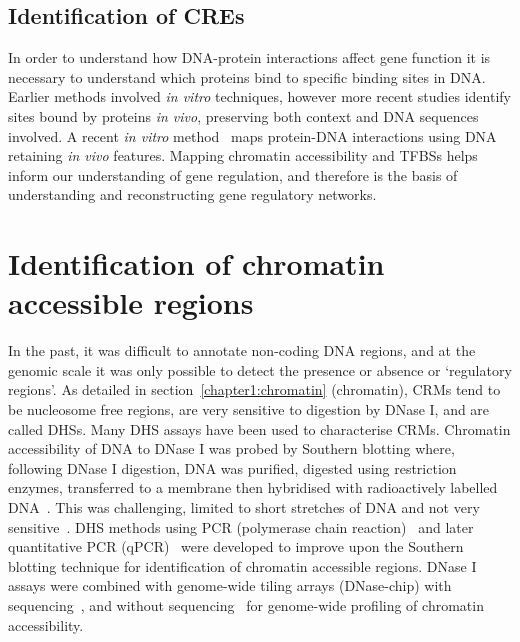 \documentclass[../main.tex]{subfiles}
\begin{document}
\subsection{Identification of CREs}\label{chapter1:identification-of-cres}

In order to understand how DNA\hyp{}protein interactions affect gene function it is necessary to understand which proteins bind to specific binding sites in DNA.
Earlier methods involved \textit{in vitro} techniques, however more recent studies identify sites bound by proteins \textit{in vivo}, preserving both context and DNA sequences involved.
A recent \textit{in vitro} method~\autocite{omalleyCistromeEpicistromeFeatures2016} maps protein\hyp{}DNA interactions using DNA retaining \textit{in vivo} features.
Mapping chromatin accessibility and TFBSs helps inform our understanding of gene regulation, and therefore is the basis of understanding and reconstructing gene regulatory networks.

\section{Identification of chromatin accessible
  regions}\label{chapter1:identification-of-chromatin-accessible-regions}
In the past, it was difficult to annotate non\hyp{}coding DNA regions, and at the genomic scale it was only possible to detect the presence or absence or `regulatory regions'.
As detailed in section~\ref{chapter1:chromatin} (chromatin), CRMs tend to be nucleosome free regions, are very sensitive to digestion by DNase I, and are called  DHSs. Many DHS assays have been used to characterise CRMs.
Chromatin accessibility of DNA to DNase I was probed by Southern blotting where, following DNase I digestion, DNA was purified, digested using restriction enzymes, transferred to a membrane then hybridised with radioactively labelled DNA~\autocite{wuChromatinStructureSpecific1979,matherMethylationStatusDNase1983,benderVglobinGeneSwitching2000,wangChromatinStructureMapping2001}.
This was challenging, limited to short stretches of DNA and not very sensitive~\autocite{cockerillIdentificationDNaseIHypersensitive2000}.
DHS methods using PCR (polymerase chain reaction)~\autocite{pfeiferChromatinDifferencesActive1991,fengHighresolutionAnalysisCfos1992} and later quantitative PCR (qPCR)~\autocite{mcarthurQuantificationDNaseIsensitivityRealtime2001,dorschnerHighthroughputLocalizationFunctional2004,martinsTrackingChromatinStates2007} were developed to improve upon the Southern blotting technique for identification of chromatin accessible regions.
DNase I assays were combined with genome\hyp{}wide tiling arrays (DNase-chip) with sequencing~\autocite{crawfordIdentifyingGeneRegulatory2004,saboGenomewideIdentificationDNaseI2004}, and without sequencing~\autocite{crawfordDNasechipHighresolutionMethod2006,saboGenomescaleMappingDNase2006,followsIdentifyingGeneRegulatory2006,shuDistinctModesDNA2012} for genome\hyp{}wide profiling of chromatin accessibility.
\end{document}
